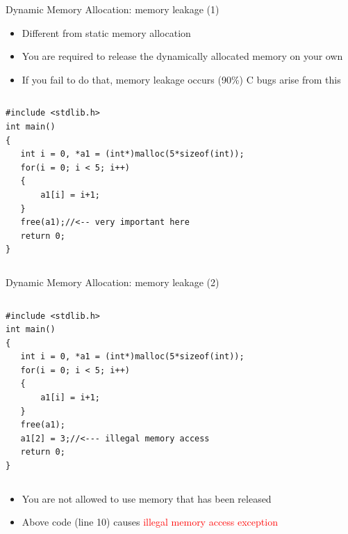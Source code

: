\begin{frame}[fragile]{Dynamic Memory Allocation: memory leakage (1)}
\begin{itemize}
	\item {Different from static memory allocation}
	\item {You are required to release the dynamically allocated memory on your own}
	\item {If you fail to do that, memory leakage occurs (90\%) C bugs arise from this}
\end{itemize}
\begin{columns}
\begin{column}{0.8\linewidth}
\begin{lstlisting}
#include <stdlib.h>
int main()
{
   int i = 0, *a1 = (int*)malloc(5*sizeof(int));
   for(i = 0; i < 5; i++)
   {
       a1[i] = i+1;
   }
   free(a1);//<-- very important here
   return 0;
}
\end{lstlisting}
\end{column}
\end{columns}
\end{frame}

\begin{frame}[fragile]{Dynamic Memory Allocation: memory leakage (2)}
\begin{columns}
\begin{column}{0.8\linewidth}
\begin{lstlisting}
#include <stdlib.h>
int main()
{
   int i = 0, *a1 = (int*)malloc(5*sizeof(int));
   for(i = 0; i < 5; i++)
   {
       a1[i] = i+1;
   }
   free(a1);
   a1[2] = 3;//<--- illegal memory access
   return 0;
}
\end{lstlisting}
\end{column}
\end{columns}
\begin{itemize}
	\item {You are not allowed to use memory that has been released}
	\item {Above code (line 10) causes \textcolor{red}{illegal memory access exception}}
\end{itemize}
\end{frame}

